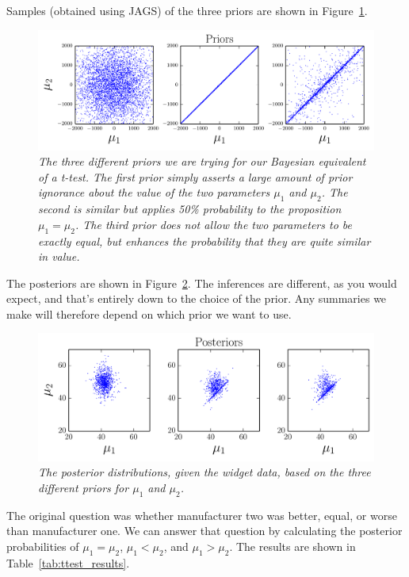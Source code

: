 Samples (obtained using JAGS) of the three priors are shown in
Figure~\ref{fig:ttest1}.
\begin{figure}[!ht]
\begin{center}
\includegraphics[scale=0.8]{Figures/ttest1.pdf}
\caption{\it The three different priors we are trying for our Bayesian
equivalent of a t-test. The first prior simply asserts a large amount of
prior ignorance about the value of the two parameters $\mu_1$ and $\mu_2$.
The second is similar but applies 50\% probability to the proposition
$\mu_1 = \mu_2$. The third prior does not allow the two parameters to be
exactly equal, but enhances the probability that they are quite similar
in value.\label{fig:ttest1}}
\end{center}
\end{figure}

The posteriors are shown in Figure~\ref{fig:ttest2}.
The inferences are different, as you would expect, and that's entirely down
to the choice of the prior. Any summaries we make will therefore depend on
which prior we want to use.
\begin{figure}[!ht]
\begin{center}
\includegraphics[scale=0.8]{Figures/ttest2.pdf}
\caption{\it The posterior distributions, given the widget data,
based on the three different priors for $\mu_1$ and $\mu_2$.\label{fig:ttest2}}
\end{center}
\end{figure}

The original question was whether manufacturer two was better, equal, or worse
than manufacturer one. We can answer that question by calculating the
posterior probabilities of $\mu_1 = \mu_2$, $\mu_1 < \mu_2$, and
$\mu_1 > \mu_2$. The results are shown in Table~\ref{tab:ttest_results}.

